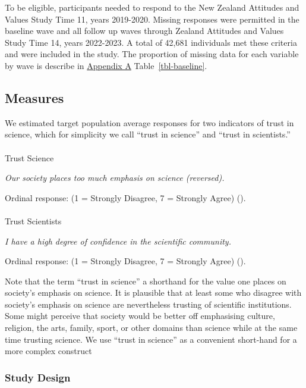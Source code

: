 \documentclass[
  single column]{article}
\makeatletter
\let\oldparagraph\paragraph
\renewcommand{\paragraph}{
    \@ifstar
      \xxxParagraphStar
      \xxxParagraphNoStar
  }
\newcommand{\xxxParagraphStar}[1]{\oldparagraph*{#1}\mbox{}}
\newcommand{\xxxParagraphNoStar}[1]{\oldparagraph{#1}\mbox{}}
\makeatother
\begin{document}
To be eligible, participants needed to respond to the New Zealand
Attitudes and Values Study Time 11, years 2019-2020. Missing responses
were permitted in the baseline wave and all follow up waves through
Zealand Attitudes and Values Study Time 14, years 2022-2023. A total of
42,681 individuals met these criteria and were included in the study.
The proportion of missing data for each variable by wave is describe in
\hyperref[appendix-a]{Appendix A} Table~\ref{tbl-baseline}.

\subsection{Measures}\label{measures}

We estimated target population average responses for two indicators of
trust in science, which for simplicity we call ``trust in science'' and
``trust in scientists.''

\paragraph{Trust Science}\label{trust-science}

\emph{Our society places too much emphasis on science (reversed).}

Ordinal response: (1 = Strongly Disagree, 7 = Strongly Agree)
().

\paragraph{Trust Scientists}\label{trust-scientists}

\emph{I have a high degree of confidence in the scientific community.}

Ordinal response: (1 = Strongly Disagree, 7 = Strongly Agree)
().

Note that the term ``trust in science'' a shorthand for the value one
places on society's emphasis on science. It is plausible that at least
some who disagree with society's emphasis on science are nevertheless
trusting of scientific institutions. Some might perceive that society
would be better off emphasising culture, religion, the arts, family,
sport, or other domains than science while at the same time trusting
science. We use ``trust in science'' as a convenient short-hand for a
more complex construct

\subsubsection{Study Design}\label{study-design}
\end{document}
